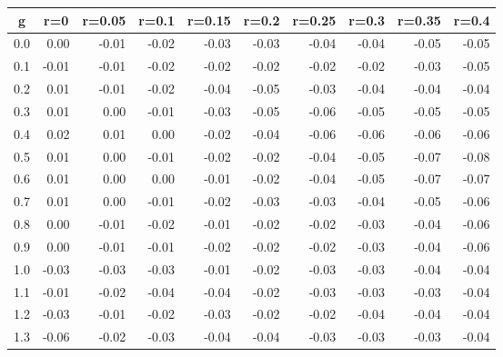 %
\begin{table}[!tbp]
 \begin{center}
 \begin{tabular}{rrrrrrrrrr}\hline\hline
\multicolumn{1}{c}{g}&\multicolumn{1}{c}{r=0}&\multicolumn{1}{c}{r=0.05}&\multicolumn{1}{c}{r=0.1}&\multicolumn{1}{c}{r=0.15}&\multicolumn{1}{c}{r=0.2}&\multicolumn{1}{c}{r=0.25}&\multicolumn{1}{c}{r=0.3}&\multicolumn{1}{c}{r=0.35}&\multicolumn{1}{c}{r=0.4}\tabularnewline
\hline
0.0& 0.00&-0.01&-0.02&-0.03&-0.03&-0.04&-0.04&-0.05&-0.05\tabularnewline
0.1&-0.01&-0.01&-0.02&-0.02&-0.02&-0.02&-0.02&-0.03&-0.05\tabularnewline
0.2& 0.01&-0.01&-0.02&-0.04&-0.05&-0.03&-0.04&-0.04&-0.04\tabularnewline
0.3& 0.01& 0.00&-0.01&-0.03&-0.05&-0.06&-0.05&-0.05&-0.05\tabularnewline
0.4& 0.02& 0.01& 0.00&-0.02&-0.04&-0.06&-0.06&-0.06&-0.06\tabularnewline
0.5& 0.01& 0.00&-0.01&-0.02&-0.02&-0.04&-0.05&-0.07&-0.08\tabularnewline
0.6& 0.01& 0.00& 0.00&-0.01&-0.02&-0.04&-0.05&-0.07&-0.07\tabularnewline
0.7& 0.01& 0.00&-0.01&-0.02&-0.03&-0.03&-0.04&-0.05&-0.06\tabularnewline
0.8& 0.00&-0.01&-0.02&-0.01&-0.02&-0.02&-0.03&-0.04&-0.06\tabularnewline
0.9& 0.00&-0.01&-0.01&-0.02&-0.02&-0.02&-0.03&-0.04&-0.06\tabularnewline
1.0&-0.03&-0.03&-0.03&-0.01&-0.02&-0.03&-0.03&-0.04&-0.04\tabularnewline
1.1&-0.01&-0.02&-0.04&-0.04&-0.02&-0.03&-0.03&-0.03&-0.04\tabularnewline
1.2&-0.03&-0.01&-0.02&-0.03&-0.02&-0.02&-0.04&-0.04&-0.04\tabularnewline
1.3&-0.06&-0.02&-0.03&-0.04&-0.04&-0.03&-0.03&-0.03&-0.04\tabularnewline
\hline
\end{tabular}

\end{center}

\end{table}

